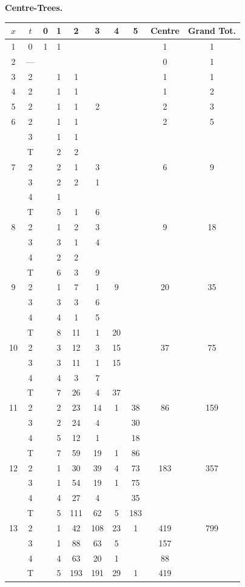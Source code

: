 \documentclass[11pt,a4paper]{article}
\begin{document}
\begin{small}
\noindent\textbf{Centre-Trees.}
\begin{center}
\begin{tabular}{|c|c|cccccc|c|c|}
\hline
$x$ & $t$ & 0 & 1 & 2 & 3 & 4 & 5 & Centre & Grand Tot. \\
\hline
1 & 0 & 1 & 1 & & & & & 1 & 1 \\
\hline
2 & --- & & & & & & & 0 & 1 \\
\hline
3 & 2 & & 1 & 1 & & & & 1 & 1 \\
\hline
4 & 2 & & 1 & 1 & & & & 1 & 2 \\
\hline
5 & 2 & & 1 & 1 & 2 & & & 2 & 3 \\
\hline
6 & 2 & & 1 & 1 & & & & 2 & 5 \\
  & 3 & & 1 & 1 & & & & & \\
  & T & & 2 & 2 & & & & & \\
\hline
7 & 2 & & 2 & 1 & 3 & & & 6 & 9 \\
  & 3 & & 2 & 2 & 1 & & & & \\
  & 4 & & 1 & & & & & & \\
  & T & & 5 & 1 & 6 & & & & \\
\hline
8 & 2 & & 1 & 2 & 3 & & & 9 & 18 \\
  & 3 & & 3 & 1 & 4 & & & & \\
  & 4 & & 2 & 2 & & & & & \\
  & T & & 6 & 3 & 9 & & & & \\
\hline
9 & 2 & & 1 & 7 & 1 & 9 & & 20 & 35 \\
  & 3 & & 3 & 3 & 6 & & & & \\
  & 4 & & 4 & 1 & 5 & & & & \\
  & T & & 8 & 11 & 1 & 20 & & & \\
\hline
10 & 2 & & 3 & 12 & 3 & 15 & & 37 & 75 \\
   & 3 & & 3 & 11 & 1 & 15 & & & \\
   & 4 & & 4 & 3 & 7 & & & & \\
   & T & & 7 & 26 & 4 & 37 & & & \\
\hline
11 & 2 & & 2 & 23 & 14 & 1 & 38 & 86 & 159 \\
   & 3 & & 2 & 24 & 4 & & 30 & & \\
   & 4 & & 5 & 12 & 1 & & 18 & & \\
   & T & & 7 & 59 & 19 & 1 & 86 & & \\
\hline
12 & 2 & & 1 & 30 & 39 & 4 & 73 & 183 & 357 \\
   & 3 & & 1 & 54 & 19 & 1 & 75 & & \\
   & 4 & & 4 & 27 & 4 & & 35 & & \\
   & T & & 5 & 111 & 62 & 5 & 183 & & \\
\hline
13 & 2 & & 1 & 42 & 108 & 23 & 1 & 419 & 799 \\
   & 3 & & 1 & 88 & 63 & 5 & & 157 & \\
   & 4 & & 4 & 63 & 20 & 1 & & 88 & \\
   & T & & 5 & 193 & 191 & 29 & 1 & 419 & \\
\hline
\end{tabular}
\end{center}
\end{small}
\end{document}
